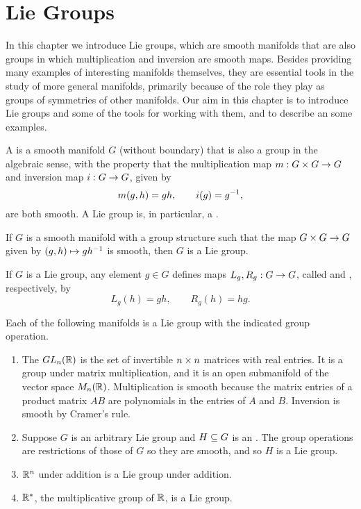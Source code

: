 \newpage\setcounter{section}{6}
\section{Lie Groups}

In this chapter we introduce Lie groups, which are smooth manifolds that are also groups in which multiplication and inversion are smooth maps. Besides providing many examples of interesting manifolds themselves, they are essential tools in the study of more general manifolds, primarily because of the role they play as groups of symmetries of other manifolds. Our aim in this chapter is to introduce Lie groups and some of the tools for working with them, and to describe an some examples.

\dfn A  is a smooth manifold $G$ (without boundary) that is also a group in the algebraic sense, with the property that the multiplication map $m: G\times G\rightarrow G$ and inversion map $i:G\rightarrow G$, given by
\[m(g,h) = gh,\qquad i(g) = g^{-1},\]
are both smooth. A Lie group is, in particular, a .

\begin{prop}
If $G$ is a smooth manifold with a group structure such that the map $G\times G\rightarrow G$ given by $(g,h)\mapsto gh^{-1}$ is smooth, then $G$ is a Lie group.
\end{prop}

\dfn If $G$ is a Lie group, any element $g\in G$ defines maps $L_g, R_g:G\rightarrow G$, called  and , respectively, by
\[L_g(h) = gh,\qquad R_g(h) = hg.\]

\begin{ex}
Each of the following manifolds is a Lie group with the indicated group operation.
\begin{enumerate}
    \item The  $GL_n(\mathbb{R})$ is the set of invertible $n\times n$ matrices with real entries. It is a group under matrix multiplication, and it is an open submanifold of the vector space $M_n(\mathbb{R})$. Multiplication is smooth because the matrix entries of a product matrix $AB$ are polynomials in the entries of $A$ and $B$. Inversion is smooth by Cramer's rule.
    \item Suppose $G$ is an arbitrary Lie group and $H\subseteq G$ is an . The group operations are restrictions of those of $G$ so they are smooth, and so $H$ is a Lie group.
    \item $\mathbb{R}^n$ under addition is a Lie group under addition.
    \item $\mathbb{R}^*$, the multiplicative group of $\mathbb{R}$, is a Lie group.
\end{enumerate}
\end{ex}

